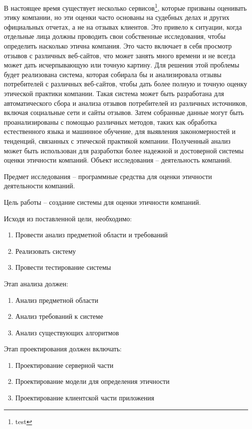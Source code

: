 \documentclass[PI, VKR]{HSEUniversity}
\begin{document}
В настоящее время существует несколько сервисов\footnote{test}, которые призваны оценивать этику компании, но эти оценки часто основаны на судебных делах и других официальных отчетах, а не на отзывах клиентов. Это привело к ситуации, когда отдельные лица должны проводить свои собственные исследования, чтобы определить насколько этична компания. Это часто включает в себя просмотр отзывов с различных веб-сайтов, что может занять много времени и не всегда может дать исчерпывающую или точную картину.
Для решения этой проблемы будет реализована система, которая собирала бы и анализировала отзывы потребителей с различных веб-сайтов, чтобы дать более полную и точную оценку этической практики компании. Такая система может быть разработана для автоматического сбора и анализа отзывов потребителей из различных источников, включая социальные сети и сайты отзывов. Затем собранные данные могут быть проанализированы с помощью различных методов, таких как обработка естественного языка и машинное обучение, для выявления закономерностей и тенденций, связанных с этической практикой компании. Полученный анализ может быть использован для разработки более надежной и достоверной системы оценки этичности компаний.
Объект исследования – деятельность компаний.

Предмет исследования – программные средства для оценки этичности деятельности компаний.

Цель работы – создание системы для оценки этичности компаний.

Исходя из поставленной цели, необходимо:

\begin{enumerate}
\item Провести анализ предметной области и требований
\item Реализовать систему
\item Провести тестирование системы
\end{enumerate}

Этап анализа должен:
\begin{enumerate}
\item Анализ предметной области
\item Анализ требований к системе
\item Анализ существующих алгоритмов
\end{enumerate}

Этап проектирования должен включать:
\begin{enumerate}
\item Проектирование серверной части
\item Проектирование модели для определения этичности
\item Проектирование клиентской части приложения
\end{enumerate}
\end{document}
